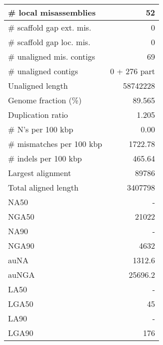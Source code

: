 \documentclass[12pt,a4paper]{article}
\begin{document}
\begin{table}[ht]
\begin{center}
\begin{tabular}{|l*{1}{|r}|}
\# local misassemblies & 52 \\ \hline
\# scaffold gap ext. mis. & 0 \\ \hline
\# scaffold gap loc. mis. & 0 \\ \hline
\# unaligned mis. contigs & 69 \\ \hline
\# unaligned contigs & 0 + 276 part \\ \hline
Unaligned length & 58742228 \\ \hline
Genome fraction (\%) & 89.565 \\ \hline
Duplication ratio & 1.205 \\ \hline
\# N's per 100 kbp & 0.00 \\ \hline
\# mismatches per 100 kbp & 1722.78 \\ \hline
\# indels per 100 kbp & 465.64 \\ \hline
Largest alignment & 89786 \\ \hline
Total aligned length & 3407798 \\ \hline
NA50 & - \\ \hline
NGA50 & 21022 \\ \hline
NA90 & - \\ \hline
NGA90 & 4632 \\ \hline
auNA & 1312.6 \\ \hline
auNGA & 25696.2 \\ \hline
LA50 & - \\ \hline
LGA50 & 45 \\ \hline
LA90 & - \\ \hline
LGA90 & 176 \\ \hline
\end{tabular}
\end{center}
\end{table}
\end{document}
